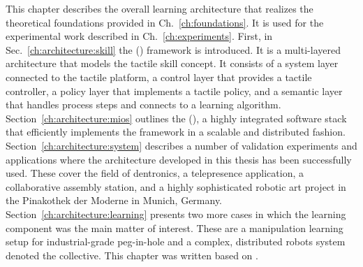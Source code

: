 This chapter describes the overall learning architecture that realizes the theoretical foundations provided in Ch.~\ref{ch:foundations}.
It is used for the experimental work described in Ch.~\ref{ch:experiments}.
First, in Sec.~\ref{ch:architecture:skill} the \skillmodel{} (\skillmodelabbr{}) framework is introduced.
It is a multi-layered architecture that models the tactile skill concept.
It consists of a system layer connected to the tactile platform, a control layer that provides a tactile controller,  a policy layer that implements a tactile policy, and a semantic layer that handles process steps and connects to a learning algorithm.
Section~\ref{ch:architecture:mios} outlines the \software{} (\softwareabbr{}), a highly integrated software stack that efficiently implements the \skillmodelabbr{} framework in a scalable and distributed fashion.
Section~\ref{ch:architecture:system} describes a number of validation experiments and applications where the architecture developed in this thesis has been successfully used.
These cover the field of dentronics, a telepresence application, a collaborative assembly station, and a highly sophisticated robotic art project in the Pinakothek der Moderne in Munich, Germany.
Section~\ref{ch:architecture:learning} presents two more cases in which the learning component was the main matter of interest.
These are a manipulation learning setup for industrial-grade peg-in-hole and a complex, distributed robots system denoted the collective.
This chapter was written based on \cite{Grischke.2019,Grischke.2020,chen2022communication,Johannsmeier.2023b}.